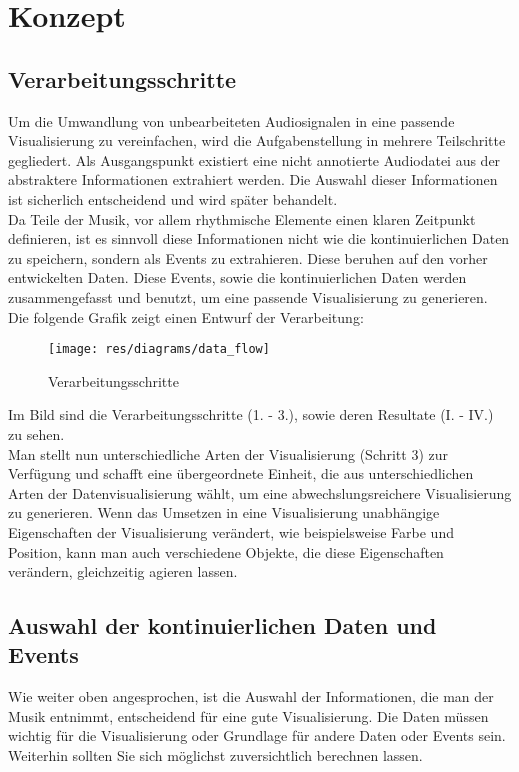 \documentclass[11pt,a4paper]{article}
\begin{document}
\newpage
\section{Konzept}
\subsection{Verarbeitungsschritte}
Um die Umwandlung von unbearbeiteten Audiosignalen in eine passende Visualisierung zu vereinfachen, wird die Aufgabenstellung in mehrere Teilschritte gegliedert. Als Ausgangspunkt existiert eine nicht annotierte Audiodatei aus der abstraktere Informationen extrahiert werden. Die Auswahl dieser Informationen ist sicherlich entscheidend und wird später behandelt.\\
Da Teile der Musik, vor allem rhythmische Elemente einen klaren Zeitpunkt definieren, ist es sinnvoll diese Informationen nicht wie die kontinuierlichen Daten zu speichern, sondern als Events zu extrahieren. Diese beruhen auf den vorher entwickelten Daten. Diese Events, sowie die kontinuierlichen Daten werden zusammengefasst und benutzt, um eine passende Visualisierung zu generieren. Die folgende Grafik zeigt einen Entwurf der Verarbeitung:
\begin{figure}[ht]
\texttt{[image: res/diagrams/data\_flow]}
\caption[Verarbeitungsschritte]{Verarbeitungsschritte}
\end{figure}
Im Bild sind die Verarbeitungsschritte (1. - 3.), sowie deren Resultate (I. - IV.) zu sehen.\\
Man stellt nun unterschiedliche Arten der Visualisierung (Schritt 3) zur Verfügung und schafft eine übergeordnete Einheit, die aus unterschiedlichen Arten der Datenvisualisierung wählt, um eine abwechslungsreichere Visualisierung zu generieren. Wenn das Umsetzen in eine Visualisierung unabhängige Eigenschaften der Visualisierung verändert, wie beispielsweise Farbe und Position, kann man auch verschiedene Objekte, die diese Eigenschaften verändern, gleichzeitig agieren lassen.

\subsection{Auswahl der kontinuierlichen Daten und Events}
Wie weiter oben angesprochen, ist die Auswahl der Informationen, die man der Musik entnimmt, entscheidend für eine gute Visualisierung. Die Daten müssen wichtig für die Visualisierung oder Grundlage für andere Daten oder Events sein. Weiterhin sollten Sie sich möglichst zuversichtlich berechnen lassen.
\end{document}
